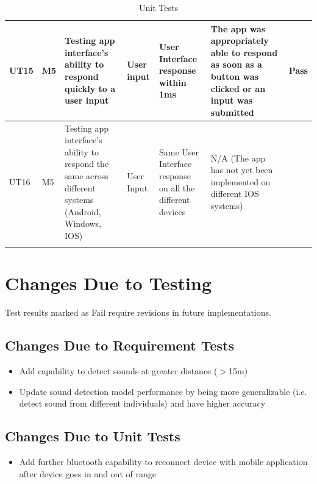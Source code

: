 \documentclass[12pt, titlepage]{article}
\begin{document}
\begin{longtable}{|p{1.4cm}|p{1cm}|p{3cm}|p{1.5cm}|p{2.5cm}|p{2cm}|p{1.2cm}|}
  UT15      &   M5   & Testing app interface's ability to respond quickly to a user input                                      & User input                                  & User Interface response within 1ms                    &         The app was appropriately able to respond as soon as a button was clicked or an input was submitted               &                {\color[HTML]{32CB00} Pass}                                    \\ \hline
  UT16      &   M5   & Testing app interface's ability to respond the same across different systems (Android, Windows, IOS)                                      & User Input                                  & Same User Interface response on all the different devices                    &        N/A (The app has not yet been implemented on different IOS systems)                &                  \cellcolor[HTML]{FFFFFF}{\color[HTML]{F8A102} N/A}                                  \\ \hline
  \caption{Unit Tests}
  \label{unitTests}
\end{longtable}

\section{Changes Due to Testing}
Test results marked as {\color[HTML]{FE0000} Fail} require revisions in future implementations. 
\subsection{Changes Due to Requirement Tests}
\begin{itemize}
  \item Add capability to detect sounds at greater distance ($>$15m)
  \item Update sound detection model performance by being more generalizable (i.e. detect sound from different individuals) and have higher accuracy
\end{itemize}
\subsection{Changes Due to Unit Tests}
\begin{itemize}
  \item Add further bluetooth capability to reconnect device with mobile application after device goes in and out of range
\end{itemize}
\end{document}
